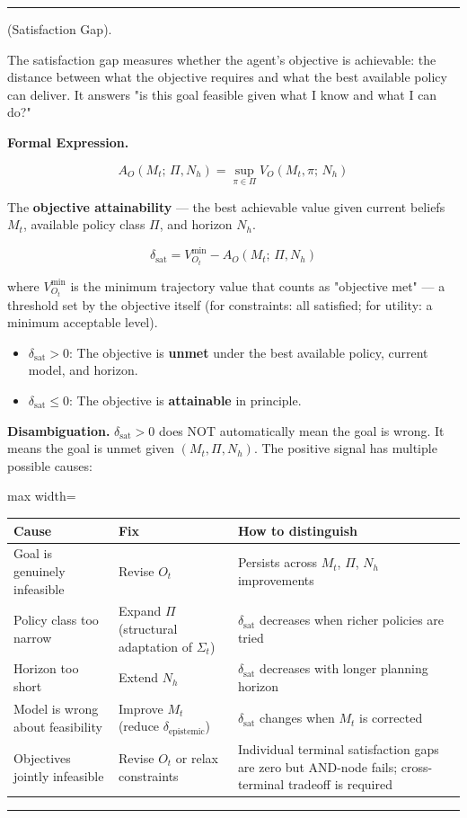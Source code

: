 \documentclass[11pt,oneside]{article}
\newcounter{claim}[section]
\renewcommand{\theclaim}{\thesection.\arabic{claim}}
\newenvironment{segment}[2]{%
  \refstepcounter{claim}%
  \bigskip\noindent\hrule\smallskip
  \noindent{\bfseries #1~\theclaim}\enskip(#2).\par\smallskip
  \noindent\ignorespaces
}{%
  \par\smallskip\noindent\hrule\bigskip
}
\newenvironment{definition}[1][]{\begin{segment}{Definition}{#1}}{\end{segment}}
\begin{document}
\begin{definition}[Satisfaction Gap]
\label{satisfaction-gap}
The satisfaction gap measures whether the agent's objective is achievable: the distance between what the objective requires and what the best available policy can deliver. It answers "is this goal feasible given what I know and what I can do?"



\medskip\noindent\textbf{Formal Expression.}



$$A_O(M_t;\, \Pi, N_h) = \sup_{\pi \in \Pi} V_O(M_t, \pi;\, N_h)$$

The \textbf{objective attainability} — the best achievable value given current beliefs $M_t$, available policy class $\Pi$, and horizon $N_h$.


$$\delta_{\text{sat}} = V_{O_t}^{\min} - A_O(M_t;\, \Pi, N_h)$$

where $V_{O_t}^{\min}$ is the minimum trajectory value that counts as "objective met" — a threshold set by the objective itself (for constraints: all satisfied; for utility: a minimum acceptable level).

\begin{itemize}
  \item $\delta_{\text{sat}} > 0$: The objective is \textbf{unmet} under the best available policy, current model, and horizon.
  \item $\delta_{\text{sat}} \leq 0$: The objective is \textbf{attainable} in principle.
\end{itemize}


\textbf{Disambiguation.} $\delta_{\text{sat}} > 0$ does NOT automatically mean the goal is wrong. It means the goal is unmet given $(M_t, \Pi, N_h)$. The positive signal has multiple possible causes:

\begin{adjustbox}{max width=\textwidth}
\small
\begin{tabular}{lll}
\toprule
Cause & Fix & How to distinguish \\
\midrule
Goal is genuinely infeasible & Revise $O_t$ & Persists across $M_t$, $\Pi$, $N_h$ improvements \\
Policy class too narrow & Expand $\Pi$ (structural adaptation of $\Sigma_t$) & $\delta_{\text{sat}}$ decreases when richer policies are tried \\
Horizon too short & Extend $N_h$ & $\delta_{\text{sat}}$ decreases with longer planning horizon \\
Model is wrong about feasibility & Improve $M_t$ (reduce $\delta_{\text{epistemic}}$) & $\delta_{\text{sat}}$ changes when $M_t$ is corrected \\
Objectives jointly infeasible & Revise $O_t$ or relax constraints & Individual terminal satisfaction gaps are zero but AND-node fails; cross-terminal tradeoff is required \\
\bottomrule
\end{tabular}
\end{adjustbox}



\end{definition}
\end{document}
